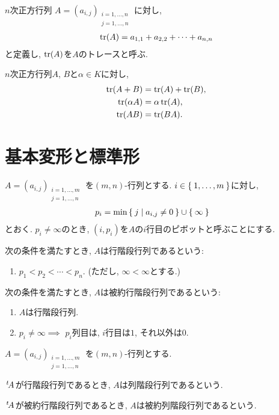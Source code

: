 \begin{definition}
  $n$次正方行列
  $A=(a_{i,j})_{\substack{i=1,\ldots,n\\j=1,\ldots,n}}$
  に対し,
  \begin{align*}
    \operatorname{tr}(A)=a_{1,1}+a_{2,2}+\cdots+a_{n,n}
  \end{align*}
  と定義し, $\operatorname{tr}(A)$を$A$のトレースと呼ぶ.
\end{definition}
\begin{remark}
  $n$次正方行列$A$, $B$と$\alpha\in K$に対し,
  \begin{align*}
    \operatorname{tr}(A+B)&=\operatorname{tr}(A)+\operatorname{tr}(B),\\
    \operatorname{tr}(\alpha A)&=\alpha\operatorname{tr}(A),\\
    \operatorname{tr}(AB)&=\operatorname{tr}(BA).
  \end{align*}
\end{remark}

\section{基本変形と標準形}
\begin{definition}
  $A=(a_{i,j})_{\substack{i=1,\ldots,m\\j=1,\ldots,n}}$
  を$(m,n)$-行列とする.
  $i\in\Set{1,\ldots,m}$に対し,
  \begin{align*}
    p_i&=\min\Set{j|a_{i,j}\neq 0} \cup \Set{\infty}
  \end{align*}
  とおく.
  $p_i\neq \infty$のとき,
  $(i,p_i)$を$A$の$i$行目のピボットと呼ぶことにする.

  次の条件を満たすとき, $A$は行階段行列であるという:
  \begin{enumerate}
  \item $p_1<p_2<\cdots<p_n$.
      (ただし, $\infty<\infty$とする.)
  \end{enumerate}
  次の条件を満たすとき, $A$は被約行階段行列であるという:
  \begin{enumerate}
  \item $A$は行階段行列.
  \item $p_i\neq \infty\implies$ $p_i$列目は, $i$行目は$1$, それ以外は$0$.
  \end{enumerate}
\end{definition}
\begin{definition}
  $A=(a_{i,j})_{\substack{i=1,\ldots,m\\j=1,\ldots,n}}$
  を$(m,n)$-行列とする.
  
  $\left.^{t}\!A\right.$が行階段行列であるとき,
  $A$は列階段行列であるという.

  $\left.^{t}\!A\right.$が被約行階段行列であるとき,
  $A$は被約列階段行列であるという.
\end{definition}

